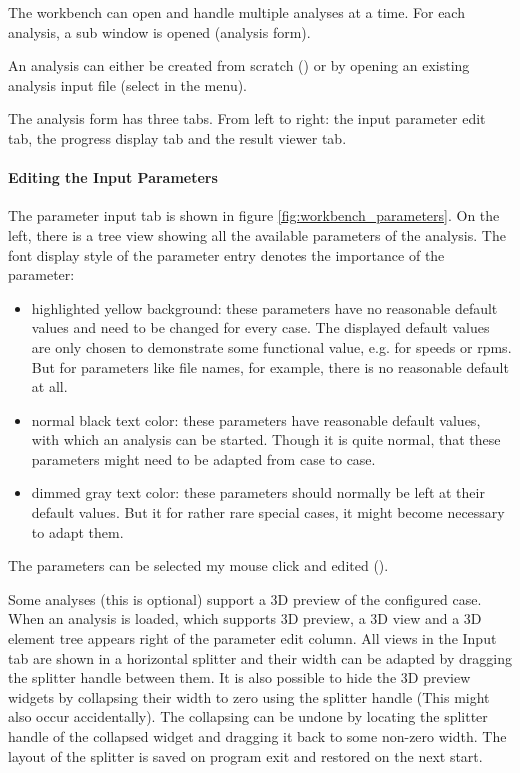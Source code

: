 The workbench can open and handle multiple analyses at a time. For each analysis, a sub window is opened (analysis form).

An analysis can either be created from scratch () or by opening an existing analysis input file (select  in the menu).

The analysis form has three tabs. From left to right: the input parameter edit tab, the progress display tab and the result viewer tab.

\paragraph{Editing the Input Parameters}
The parameter input tab is shown in figure \ref{fig:workbench_parameters}. On the left, there is a tree view showing all the available parameters of the analysis.
The font display style of the parameter entry denotes the importance of the parameter:
\begin{itemize}

\item highlighted yellow background: these parameters have no reasonable default values and need to be changed for every case. The displayed default values are only chosen to demonstrate some functional value, e.g. for speeds or rpms. But for parameters like file names, for  example, there is no reasonable default at all.

\item normal black text color: these parameters have reasonable default values, with which an analysis can be started. Though it is quite normal, that these parameters might need to be adapted from case to case.

\item dimmed gray text color: these parameters should normally be left at their default values. But it for rather rare special cases, it might become necessary to adapt them.
\end{itemize}

The parameters can be selected my mouse click and edited ().

Some analyses (this is optional) support a 3D preview of the configured case.
When an analysis is loaded, which supports 3D preview, a 3D view and a 3D element tree appears right of the parameter edit column.
All views in the Input tab are shown in a horizontal splitter and their width can be adapted by dragging the splitter handle between them. It is also possible to hide the 3D preview widgets by collapsing their width to zero using the splitter handle (This might also occur accidentally). The collapsing can be undone by locating the splitter handle of the collapsed widget and dragging it back to some non-zero width.
The layout of the splitter is saved on program exit and restored on the next start.


